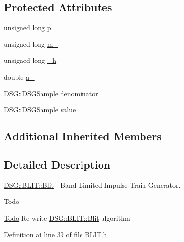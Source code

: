 \subsection*{Protected Attributes}
\begin{DoxyCompactItemize}
\item 
unsigned long \hyperlink{class_d_s_g_1_1_b_l_i_t_1_1_blit_a04d7d6b22a386428e5c25668e1587794}{p\+\_\+}
\item 
unsigned long \hyperlink{class_d_s_g_1_1_b_l_i_t_1_1_blit_afa6e4d46efdbfa032762610601ed42a0}{m\+\_\+}
\item 
unsigned long \hyperlink{class_d_s_g_1_1_b_l_i_t_1_1_blit_a632c6f070187969b90c70b65668b82bc}{\+\_\+h}
\item 
double \hyperlink{class_d_s_g_1_1_b_l_i_t_1_1_blit_a66e2a97840ad0772daaaa9aea63b77b4}{a\+\_\+}
\item 
\hyperlink{namespace_d_s_g_ac39a94cd27ebcd9c1e7502d0c624894a}{D\+S\+G\+::\+D\+S\+G\+Sample} \hyperlink{class_d_s_g_1_1_b_l_i_t_1_1_blit_a6de89a5a240f226c940aef97661c9cee}{denominator}
\item 
\hyperlink{namespace_d_s_g_ac39a94cd27ebcd9c1e7502d0c624894a}{D\+S\+G\+::\+D\+S\+G\+Sample} \hyperlink{class_d_s_g_1_1_b_l_i_t_1_1_blit_ac8fb9d4fb45d0697bf364bb5d6b570ce}{value}
\end{DoxyCompactItemize}
\subsection*{Additional Inherited Members}


\subsection{Detailed Description}
\hyperlink{class_d_s_g_1_1_b_l_i_t_1_1_blit}{D\+S\+G\+::\+B\+L\+I\+T\+::\+Blit} -\/ Band-\/\+Limited Impulse Train Generator. 

\begin{DoxyRefDesc}{Todo}
\item[\hyperlink{todo__todo000001}{Todo}]Re-\/write \hyperlink{class_d_s_g_1_1_b_l_i_t_1_1_blit}{D\+S\+G\+::\+B\+L\+I\+T\+::\+Blit} algorithm \end{DoxyRefDesc}


Definition at line \hyperlink{_b_l_i_t_8h_source_l00039}{39} of file \hyperlink{_b_l_i_t_8h_source}{B\+L\+I\+T.\+h}.



